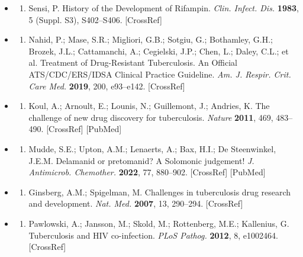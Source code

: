 \documentclass{article}
\begin{document}
\begin{itemize}
\begin{enumerate}
\end{enumerate}

\item \begin{enumerate}
\item 
Sensi, P. History of the Development of Rifampin. \textit{Clin. Infect. Dis.} \textbf{1983}, 5 (Suppl. S3), S402–S406. [CrossRef]

\end{enumerate}

\item \begin{enumerate}
\item 
Nahid, P.; Mase, S.R.; Migliori, G.B.; Sotgiu, G.; Bothamley, G.H.; Brozek, J.L.; Cattamanchi, A.; Cegielski, J.P.; Chen, L.; Daley, C.L.; et al. Treatment of Drug-Resistant Tuberculosis. An Official ATS/CDC/ERS/IDSA Clinical Practice Guideline. \textit{Am. J. Respir. Crit. Care Med.} \textbf{2019}, 200, e93–e142. [CrossRef]

\end{enumerate}

\item \begin{enumerate}
\item 
Koul, A.; Arnoult, E.; Lounis, N.; Guillemont, J.; Andries, K. The challenge of new drug discovery for tuberculosis. \textit{Nature} \textbf{2011}, 469, 483–490. [CrossRef] [PubMed]

\end{enumerate}

\item \begin{enumerate}
\item 
Mudde, S.E.; Upton, A.M.; Lenaerts, A.; Bax, H.I.; De Steenwinkel, J.E.M. Delamanid or pretomanid? A Solomonic judgement! \textit{J. Antimicrob. Chemother.} \textbf{2022}, 77, 880–902. [CrossRef] [PubMed]

\end{enumerate}

\item \begin{enumerate}
\item 
Ginsberg, A.M.; Spigelman, M. Challenges in tuberculosis drug research and development. \textit{Nat. Med.} \textbf{2007}, 13, 290–294. [CrossRef]

\end{enumerate}

\item \begin{enumerate}
\item 
Pawlowski, A.; Jansson, M.; Skold, M.; Rottenberg, M.E.; Kallenius, G. Tuberculosis and HIV co-infection. \textit{PLoS Pathog.} \textbf{2012}, 8, e1002464. [CrossRef]


\end{enumerate}
\end{itemize}
\end{document}
